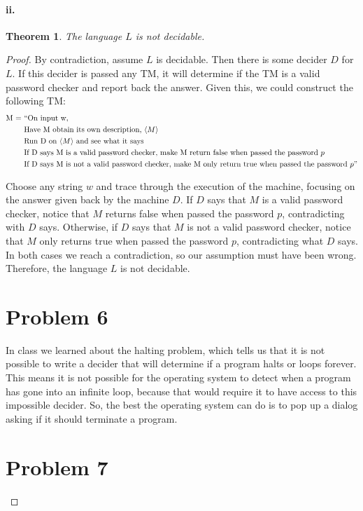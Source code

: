 \documentclass[10pt,letter]{article}
\newtheorem*{thm}{Theorem}
\begin{document}
\paragraph{ii.} 
\begin{thm} The language $L$ is not decidable. \end{thm}
\begin{proof} By contradiction, assume $L$ is decidable. Then there is some decider $D$ for $L$. If this decider is passed any TM, it will determine if the TM is a valid password checker and report back the answer. Given this, we could construct the following TM:
\begin{align*}
\text{M = }&\text{``On input w,}\\
&\text{Have M obtain its own description, }\langle M \rangle\\
&\text{Run D on }\langle M \rangle \text{ and see what it says}\\
&\text{If D says M is a valid password checker, make M return false when passed the password } p\\
&\text{If D says M is not a valid password checker, make M only return true when passed the password } p"
\end{align*}

Choose any string $w$ and trace through the execution of the machine, focusing on the answer given back by the machine $D$. If $D$ says that $M$ is a valid password checker, notice that $M$ returns false when passed the password $p$, contradicting with $D$ says. Otherwise, if $D$ says that $M$ is not a valid password checker, notice that $M$ only returns true when passed the password $p$, contradicting what $D$ says. In both cases we reach a contradiction, so our assumption must have been wrong. Therefore, the language $L$ is not decidable.

\section*{Problem 6}
In class we learned about the halting problem, which tells us that it is not possible to write a decider that will determine if a program halts or loops forever. This means it is not possible for the operating system to detect when a program has gone into an infinite loop, because that would require it to have access to this impossible decider. So, the best the operating system can do is to pop up a dialog asking if it should terminate a program. 

\section*{Problem 7}


\end{proof}
\end{document}
